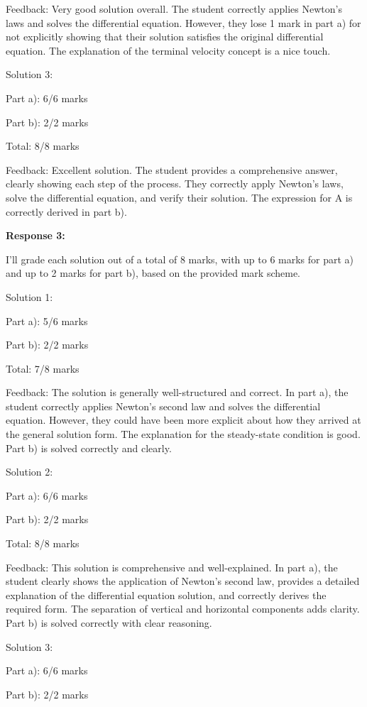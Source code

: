 \documentclass[a4paper,11pt]{article}
\begin{document}
Feedback: Very good solution overall. The student correctly applies Newton's laws and solves the differential equation. However, they lose 1 mark in part a) for not explicitly showing that their solution satisfies the original differential equation. The explanation of the terminal velocity concept is a nice touch.

Solution 3:

Part a): 6/6 marks

Part b): 2/2 marks

Total: 8/8 marks

Feedback: Excellent solution. The student provides a comprehensive answer, clearly showing each step of the process. They correctly apply Newton's laws, solve the differential equation, and verify their solution. The expression for A is correctly derived in part b).

\bigskip
\textbf{Response 3:}

I'll grade each solution out of a total of 8 marks, with up to 6 marks for part a) and up to 2 marks for part b), based on the provided mark scheme.

Solution 1:

Part a): 5/6 marks

Part b): 2/2 marks

Total: 7/8 marks

Feedback: The solution is generally well-structured and correct. In part a), the student correctly applies Newton's second law and solves the differential equation. However, they could have been more explicit about how they arrived at the general solution form. The explanation for the steady-state condition is good. Part b) is solved correctly and clearly.

Solution 2:

Part a): 6/6 marks

Part b): 2/2 marks

Total: 8/8 marks

Feedback: This solution is comprehensive and well-explained. In part a), the student clearly shows the application of Newton's second law, provides a detailed explanation of the differential equation solution, and correctly derives the required form. The separation of vertical and horizontal components adds clarity. Part b) is solved correctly with clear reasoning.

Solution 3:

Part a): 6/6 marks

Part b): 2/2 marks
\end{document}
